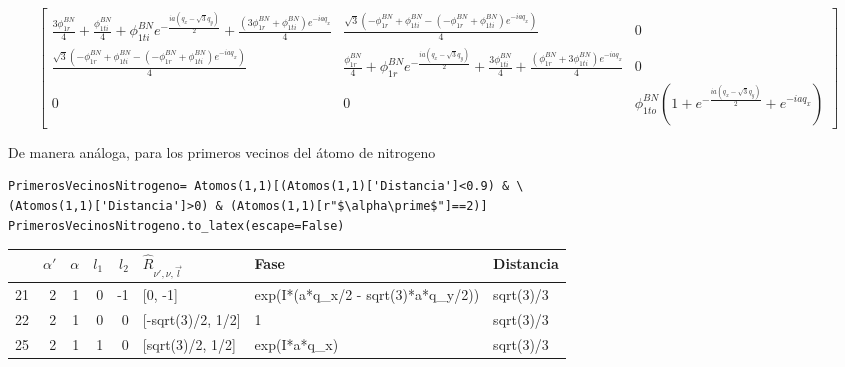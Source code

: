 \documentclass[12pt,a4paper]{article}
\begin{document}
\begin{equation}
\left[\begin{matrix}\frac{3 \phi^{BN}_{1r}}{4} + \frac{\phi^{BN}_{1ti}}{4} + \phi^{BN}_{1ti} e^{- \frac{i a \left(q_{x} - \sqrt{3} q_{y}\right)}{2}} + \frac{\left(3 \phi^{BN}_{1r} + \phi^{BN}_{1ti}\right) e^{- i a q_{x}}}{4} & \frac{\sqrt{3} \left(- \phi^{BN}_{1r} + \phi^{BN}_{1ti} - \left(- \phi^{BN}_{1r} + \phi^{BN}_{1ti}\right) e^{- i a q_{x}}\right)}{4} & 0\\\frac{\sqrt{3} \left(- \phi^{BN}_{1r} + \phi^{BN}_{1ti} - \left(- \phi^{BN}_{1r} + \phi^{BN}_{1ti}\right) e^{- i a q_{x}}\right)}{4} & \frac{\phi^{BN}_{1r}}{4} + \phi^{BN}_{1r} e^{- \frac{i a \left(q_{x} - \sqrt{3} q_{y}\right)}{2}} + \frac{3 \phi^{BN}_{1ti}}{4} + \frac{\left(\phi^{BN}_{1r} + 3 \phi^{BN}_{1ti}\right) e^{- i a q_{x}}}{4} & 0\\0 & 0 & \phi^{BN}_{1to} \left(1 + e^{- \frac{i a \left(q_{x} - \sqrt{3} q_{y}\right)}{2}} + e^{- i a q_{x}}\right)\end{matrix}\right]
\end{equation}

De manera análoga, para los primeros vecinos del átomo de nitrogeno

\begin{verbatim}
PrimerosVecinosNitrogeno= Atomos(1,1)[(Atomos(1,1)['Distancia']<0.9) & \
(Atomos(1,1)['Distancia']>0) & (Atomos(1,1)[r"$\alpha\prime$"]==2)]
PrimerosVecinosNitrogeno.to_latex(escape=False)
\end{verbatim}

\begin{tabular}{lrrrrlll}
\toprule
{} &  $\alpha\prime$ &  $\alpha$ &  $l_1$ &  $l_2$ & $\hat R_{\nu\prime,\nu,\vec l}$ &                                Fase &  Distancia \\
\midrule
21 &               2 &         1 &      0 &     -1 &                         [0, -1] &  exp(I*(a*q_x/2 - sqrt(3)*a*q_y/2)) &  sqrt(3)/3 \\
22 &               2 &         1 &      0 &      0 &               [-sqrt(3)/2, 1/2] &                                   1 &  sqrt(3)/3 \\
25 &               2 &         1 &      1 &      0 &                [sqrt(3)/2, 1/2] &                        exp(I*a*q_x) &  sqrt(3)/3 \\
\bottomrule
\end{tabular}

\vspace{0.5cm}
\end{document}
